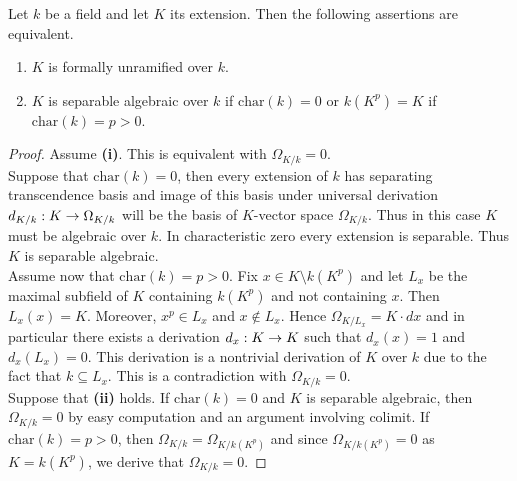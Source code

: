 \begin{theorem}\label{theorem:characterization_of_formally_unramified_field_extensions}
Let $k$ be a field and let $K$ its extension. Then the following assertions are equivalent.
\begin{enumerate}[label=\emph{\textbf{(\roman*)}}, leftmargin=3.0em]
\item $K$ is formally unramified over $k$.
\item $K$ is separable algebraic over $k$ if $\mathrm{char}(k)=0$ or $k(K^p)=K$ if $\mathrm{char}(k)=p>0$.
\end{enumerate}
\end{theorem}
\begin{proof}
Assume \textbf{(i)}. This is equivalent with $\Omega_{K/k}=0$.\\
 Suppose that $\mathrm{char}(k)=0$, then every extension of $k$ has separating transcendence basis and image of this basis under universal derivation $d_{K/k}:K\rightarrow \Omega_{K/k}$ will be the basis of $K$-vector space $\Omega_{K/k}$. Thus in this case $K$ must be algebraic over $k$. In characteristic zero every extension is separable. Thus $K$ is separable algebraic.\\ 
Assume now that $\mathrm{char}(k)=p>0$. Fix $x\in K\setminus k(K^p)$ and let $L_x$ be the maximal subfield of $K$ containing $k(K^p)$ and not containing $x$. Then $L_x(x)=K$. Moreover, $x^p \in L_x$ and $x \not \in L_x$. Hence $\Omega_{K/L_x}=K\cdot dx$ and in particular there exists a derivation $d_x:K\rightarrow K$ such that $d_x(x)=1$ and $d_x(L_x)=0$. This derivation is a nontrivial derivation of $K$ over $k$ due to the fact that $k\subseteq L_x$. This is a contradiction with $\Omega_{K/k}=0$.\\
Suppose that \textbf{(ii)} holds. If $\mathrm{char}(k)=0$ and $K$ is separable algebraic, then $\Omega_{K/k}=0$ by easy computation and an argument involving colimit. If $\mathrm{char}(k)=p>0$, then $\Omega_{K/k} = \Omega_{K/k(K^p)}$ and since $\Omega_{K/k(K^p)} = 0$ as $K = k(K^p)$, we derive that $\Omega_{K/k}=0$.
\end{proof}

